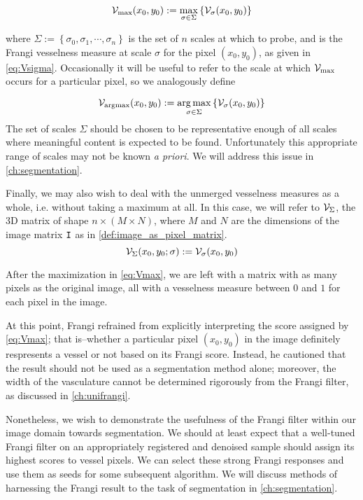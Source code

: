     \begin{equation} \label{eq:Vmax}
    \mathcal{V}_{\max}(x_0, y_0) :=
    	\underset{\sigma \in \Sigma}{\max}\left\{  \mathcal{V}_{\sigma} (x_0, y_0) \right\}
    \end{equation}
    
    where $\Sigma := \left\{ \sigma_0, \sigma_1 , \cdots, \sigma_n \right\}$ is
    the set of $n$ scales at which to probe, and \Vsigma is the Frangi vesselness measure at scale $\sigma$ for the pixel $(x_0,y_0)$, as given in \cref{eq:Vsigma}.
    Occasionally it will be useful to refer to the scale at which $\mathcal{V}_{\max}$ occurs for a 
    particular pixel, so we analogously define
    
    \begin{equation} \label{eq:Vargmax}
    \mathcal{V}_{\mathrm{argmax}}(x_0, y_0) := \underset{\sigma \in \Sigma}{\arg\max}\left\{  \mathcal{V}_{\sigma} (x_0, y_0) \right\}
    \end{equation}
The set of scales $\Sigma$ should be chosen to be representative enough of all scales where meaningful content is expected to be found. Unfortunately this appropriate range of scales may not be known \textit{a priori}. We will address this issue in \cref{ch:segmentation}.

Finally, we may also wish to deal with the unmerged vesselness measures as a whole, i.e. without taking a maximum at all. In this case, we will refer to $\mathcal{V}_{\Sigma}$, the 3D matrix of shape
$n \times (M\times N)$, where $M$ and $N$ are the dimensions of the image matrix $\mathtt{I}$
as in \cref{def:image_as_pixel_matrix}.
	\begin{equation} \label{eq:VSigma}
	\mathcal{V}_{\Sigma}(x_0,y_0 ; \sigma) := \mathcal{V}_{\sigma}(x_0,y_0)
\end{equation}

    
    After the maximization in \cref{eq:Vmax}, we are left with a matrix with as many pixels as the original image, all with a vesselness measure between $0$ and $1$ for each pixel in the image.
         
    At this point, Frangi \autocite{frangi-paper} refrained from explicitly interpreting the score assigned by \cref{eq:Vmax}; that is--whether a particular pixel $(x_0,y_0)$ in the image definitely respresents a vessel or not based on its Frangi score. Instead, he cautioned that the result should not be used as a segmentation method alone; moreover, the width of the vasculature cannot be determined rigorously from the Frangi filter, as discussed in \cref{ch:unifrangi}. 
   
    Nonetheless, we wish to demonstrate the usefulness of the Frangi filter within our image domain towards segmentation. We should at least expect that a well-tuned Frangi filter on an appropriately registered and denoised sample should assign its highest scores to vessel pixels. We can select these strong Frangi responses and use them as seeds for some subsequent algorithm. We will discuss methods of harnessing the Frangi result to the task of segmentation in \cref{ch:segmentation}.
    
